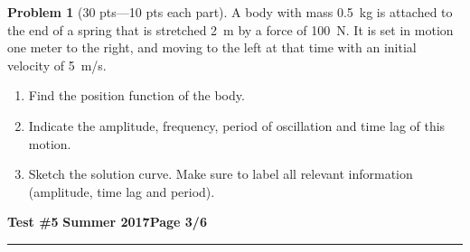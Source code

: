 \documentclass[12pt]{article}
\theoremstyle{definition}
\newtheorem{problem}{Problem}
\begin{document}
\bigskip
\begin{problem}[30 pts---10 pts each part]
A body with mass 0.5~kg is attached to the end of a spring that is stretched 2~m by a force of 100~N.  It is set in motion one meter to the right, and moving to the left at that time with an initial velocity of 5~m/s.
\begin{enumerate}
  \item Find the position function of the body.
  \vspace{4cm}
  \begin{flushright}
  \end{flushright}
  \item Indicate the amplitude, frequency, period of oscillation and time lag of this motion.
  \vspace{4cm}
  \begin{flushright}
  \end{flushright}
  \item Sketch the solution curve.  Make sure to label all relevant information (amplitude, time lag and period).
\end{enumerate}
\end{problem} 

\newpage

\hfill{\large\bf Test \#5}\hfill{\large\bf
  Summer 2017}\hfill{\large\bf Page 3/6}\hrule
\end{document}
